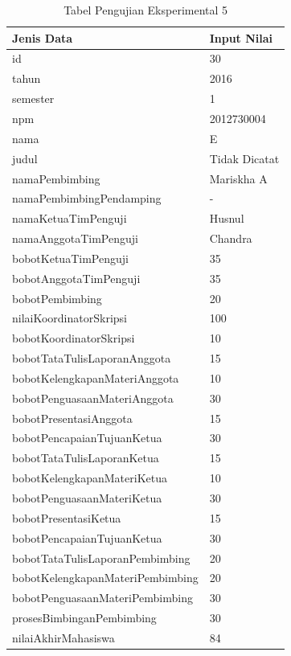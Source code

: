 	\begin{table}[H]
		\centering
		\caption{Tabel Pengujian Eksperimental 5}
		\begin{tabular}{| m{7cm} | m{5cm} |}
			\hline
			Jenis Data & Input Nilai\\
			\hline
			id & 30\\
			\hline
			tahun & 2016\\
			\hline
			semester & 1\\
			\hline
			npm & 2012730004\\
			\hline
			nama & E\\
			\hline
			judul & Tidak Dicatat\\
			\hline
			namaPembimbing & Mariskha A\\
			\hline
			namaPembimbingPendamping & -\\
			\hline
			namaKetuaTimPenguji & Husnul\\
			\hline
			namaAnggotaTimPenguji & Chandra\\
			\hline
			bobotKetuaTimPenguji & 35\\
			\hline
			bobotAnggotaTimPenguji & 35\\
			\hline
			bobotPembimbing & 20\\
			\hline
			nilaiKoordinatorSkripsi & 100\\
			\hline
			bobotKoordinatorSkripsi & 10\\
			\hline
			bobotTataTulisLaporanAnggota & 15\\
			\hline
			bobotKelengkapanMateriAnggota & 10\\
			\hline
			bobotPenguasaanMateriAnggota & 30\\
			\hline
			bobotPresentasiAnggota & 15\\
			\hline
			bobotPencapaianTujuanKetua & 30\\
			\hline
			bobotTataTulisLaporanKetua & 15\\
			\hline
			bobotKelengkapanMateriKetua & 10\\
			\hline
			bobotPenguasaanMateriKetua & 30\\
			\hline
			bobotPresentasiKetua & 15\\
			\hline
			bobotPencapaianTujuanKetua & 30\\
			\hline
			bobotTataTulisLaporanPembimbing & 20\\
			\hline
			bobotKelengkapanMateriPembimbing &20\\
			\hline
			bobotPenguasaanMateriPembimbing & 30\\
			\hline
			prosesBimbinganPembimbing & 30\\
			\hline
			nilaiAkhirMahasiswa & 84\\
			\hline
		\end{tabular}
	\end{table}

